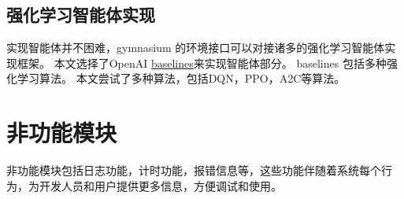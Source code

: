 \subsection{强化学习智能体实现}

实现智能体并不困难，gymnasium 的环境接口可以对接诸多的强化学习智能体实现框架。
本文选择了OpenAI \href{https://github.com/openai/baselines}{baselines}\cite{baselines}来实现智能体部分。
baselines 包括多种强化学习算法。
本文尝试了多种算法，包括DQN，PPO，A2C等算法。

\section{非功能模块}

非功能模块包括日志功能，计时功能，报错信息等，这些功能伴随着系统每个行为，为开发人员和用户提供更多信息，方便调试和使用。